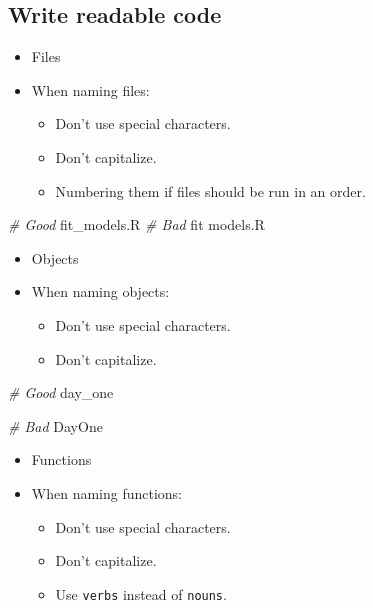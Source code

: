 \documentclass[
]{book}
\newenvironment{Shaded}{\begin{snugshade}}{\end{snugshade}}
\newcommand{\CommentTok}[1]{\textcolor[rgb]{0.56,0.35,0.01}{\textit{#1}}}
\newcommand{\NormalTok}[1]{#1}
\providecommand{\tightlist}{%
  \setlength{\itemsep}{0pt}\setlength{\parskip}{0pt}}
\begin{document}
\hypertarget{write-readable-code}{%
\subsection{Write readable code}\label{write-readable-code}}

\begin{itemize}
\tightlist
\item
  Files
\item
  When naming files:

  \begin{itemize}
  \tightlist
  \item
    Don't use special characters.
  \item
    Don't capitalize.
  \item
    Numbering them if files should be run in an order.
  \end{itemize}
\end{itemize}

\begin{Shaded}
\begin{Highlighting}[]
\CommentTok{\# Good}
\NormalTok{fit\_models.R}
\CommentTok{\# Bad}
\NormalTok{fit models.R}
\end{Highlighting}
\end{Shaded}

\begin{itemize}
\tightlist
\item
  Objects
\item
  When naming objects:

  \begin{itemize}
  \tightlist
  \item
    Don't use special characters.
  \item
    Don't capitalize.
  \end{itemize}
\end{itemize}

\begin{Shaded}
\begin{Highlighting}[]
\CommentTok{\# Good }
\NormalTok{day\_one}
    
\CommentTok{\# Bad }
\NormalTok{DayOne}
\end{Highlighting}
\end{Shaded}

\begin{itemize}
\tightlist
\item
  Functions
\item
  When naming functions:

  \begin{itemize}
  \tightlist
  \item
    Don't use special characters.
  \item
    Don't capitalize.
  \item
    Use \texttt{verbs} instead of \texttt{nouns}.
  \end{itemize}
\end{itemize}
\end{document}
